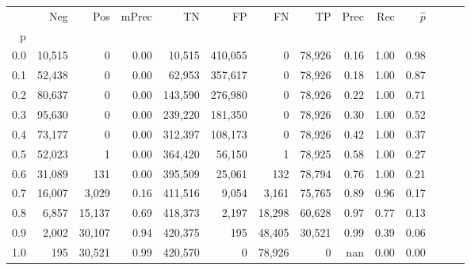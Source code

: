 \begin{tabular}{rrrrrrrrrrrrrr}
\toprule
{} &     Neg &     Pos & mPrec &       TN &       FP &      FN &      TP &  Prec &   Rec & $\hat{p}$ \\
p   &         &         &       &          &          &         &         &       &       &           \\
\midrule
0.0 &  10,515 &       0 &  0.00 &   10,515 &  410,055 &       0 &  78,926 &  0.16 &  1.00 &      0.98 \\
0.1 &  52,438 &       0 &  0.00 &   62,953 &  357,617 &       0 &  78,926 &  0.18 &  1.00 &      0.87 \\
0.2 &  80,637 &       0 &  0.00 &  143,590 &  276,980 &       0 &  78,926 &  0.22 &  1.00 &      0.71 \\
0.3 &  95,630 &       0 &  0.00 &  239,220 &  181,350 &       0 &  78,926 &  0.30 &  1.00 &      0.52 \\
0.4 &  73,177 &       0 &  0.00 &  312,397 &  108,173 &       0 &  78,926 &  0.42 &  1.00 &      0.37 \\
0.5 &  52,023 &       1 &  0.00 &  364,420 &   56,150 &       1 &  78,925 &  0.58 &  1.00 &      0.27 \\
0.6 &  31,089 &     131 &  0.00 &  395,509 &   25,061 &     132 &  78,794 &  0.76 &  1.00 &      0.21 \\
0.7 &  16,007 &   3,029 &  0.16 &  411,516 &    9,054 &   3,161 &  75,765 &  0.89 &  0.96 &      0.17 \\
0.8 &   6,857 &  15,137 &  0.69 &  418,373 &    2,197 &  18,298 &  60,628 &  0.97 &  0.77 &      0.13 \\
0.9 &   2,002 &  30,107 &  0.94 &  420,375 &      195 &  48,405 &  30,521 &  0.99 &  0.39 &      0.06 \\
1.0 &     195 &  30,521 &  0.99 &  420,570 &        0 &  78,926 &       0 &   nan &  0.00 &      0.00 \\
\bottomrule
\end{tabular}
